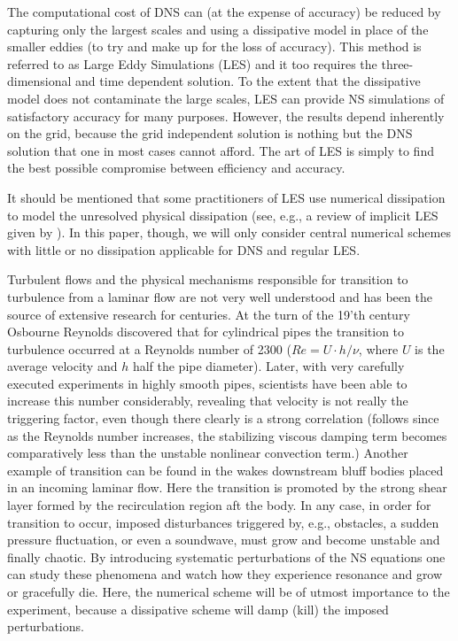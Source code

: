 The computational cost of DNS can (at the expense of accuracy) be reduced by capturing only the largest scales and using a dissipative model in place of the smaller eddies (to try and make up for the loss of accuracy). This method is referred to as Large Eddy Simulations (LES) and it too requires the three-dimensional and time dependent solution. To the extent that the dissipative model does not contaminate the large scales, LES can provide NS simulations of satisfactory accuracy for many purposes. However, the results depend inherently on the grid, because the grid independent solution is nothing but the DNS solution that one in most cases cannot afford. The art of LES is simply to find the best possible compromise between efficiency and accuracy.

It should be mentioned that some practitioners of LES use numerical dissipation to model the unresolved physical dissipation (see, e.g., a review of implicit LES given by \cite{iles}). In this paper, though, we will only consider central numerical schemes with little or no dissipation applicable for DNS and regular LES.

Turbulent flows and the physical mechanisms responsible for transition to turbulence from a laminar flow are not very well understood and has been the source of extensive research for centuries. At the turn of the 19'th century Osbourne Reynolds discovered that for cylindrical pipes the transition to turbulence occurred at a Reynolds number of 2300 ($Re=U\cdot h/\nu$, where $U$ is the average velocity and $h$ half the pipe diameter). Later, with very carefully executed experiments in highly smooth pipes, scientists have been able to increase this number considerably, revealing that velocity is not really the triggering factor, even though there clearly is a strong correlation (follows since as the Reynolds number increases, the stabilizing viscous damping term becomes comparatively less than the unstable nonlinear convection term.) Another example of transition can be found in the wakes downstream bluff bodies placed in an incoming laminar flow. Here the transition is promoted by the strong shear layer formed by the recirculation region aft the body. In any case, in order for transition to occur, imposed disturbances triggered by, e.g., obstacles, a sudden pressure fluctuation, or even a soundwave, must grow and become unstable and finally chaotic. By introducing systematic perturbations of the NS equations one can study these phenomena and watch how they experience resonance and grow or gracefully die. Here, the numerical scheme will be of utmost importance to the experiment, because a dissipative scheme will damp (kill) the imposed perturbations.

